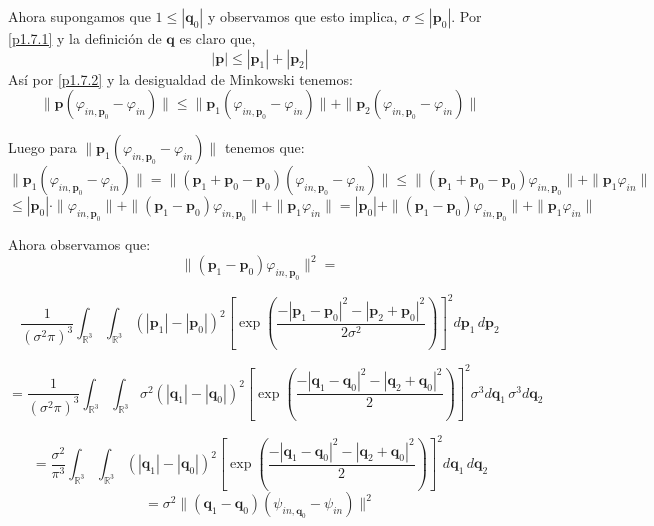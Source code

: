 \documentclass[12pt]{book}
\numberwithin{equation}{chapter}
\def\v{\mathbf}
\def\R{\mathbb{R}}
\def\vp{\varphi}
\def\P{\mathbf{p}}
\begin{document}
Ahora supongamos que $ 1 \leq |\v{q}_{0}|$ y observamos que esto implica, $\sigma \leq |\P_{0}| $. Por \eqref{p1.7.1} y la definici\'on de $\v{q}$ es claro que,
\begin{equation}\label{p1.7.2}
|\P|\leq |\P_{1}|+|\P_{2}|
\end{equation}
As\'i por \eqref{p1.7.2} y la desigualdad de Minkowski tenemos:
\begin{equation}\label{p1.7.3}
\| \P ( \vp_{in,\P_{0}} - \vp_{in} ) \| \leq \| \P_{1} ( \vp_{in,\P_{0}} - \vp_{in} ) \| + \| \P_{2} ( \vp_{in,\P_{0}} - \vp_{in} ) \|
\end{equation}

Luego para $\| \P_{1} ( \vp_{in,\P_{0}} - \vp_{in} ) \|$ tenemos que:
$$ \| \P_{1} ( \vp_{in,\P_{0}} - \vp_{in} ) \|= \| (\P_{1} + \P_{0}-\P_{0})  ( \vp_{in,\P_{0}} - \vp_{in} ) \| \leq \| (\P_{1} + \P_{0}-\P_{0}) \vp_{in,\P_{0}}  \|+ \| \P_{1} \vp_{in}  \| $$
\begin{equation}\label{p1.9}
\leq |\P_{0}| \cdot \| \vp_{in,\P_{0}} \| +\| (\P_{1}-\P_{0}) \vp_{in,\P_{0}}  \|+ \| \P_{1} \vp_{in}  \|= |\P_{0}|  +\| (\P_{1}-\P_{0}) \vp_{in,\P_{0}}  \|+ \| \P_{1} \vp_{in}  \|
\end{equation}

Ahora observamos que:
$$ \| (\P_{1}-\P_{0}) \vp_{in,\P_{0}}  \|^{2}= $$

$$\frac{1}{(\sigma^{2}\pi)^{3}} \int_{\R^{3}} \int_{\R^{3}} (|\P_{1}|-|\P_{0}|)^{2} \left[ \exp\left(\frac{-|\P_{1}-\P_{0}|^{2}-|\P_{2}+\P_{0}|^{2} }{2\sigma^{2}} \right) \right]^{2} d\P_{1}\,d\P_{2} $$

$$=\frac{1}{(\sigma^{2}\pi)^{3}} \int_{\R^{3}} \int_{\R^{3}} \sigma^{2} (|\v{q}_{1}|-|\v{q}_{0}|)^{2} \left[ \exp\left(\frac{-|\v{q}_{1}-\v{q}_{0}|^{2}-|\v{q}_{2}+\v{q}_{0}|^{2} }{2} \right) \right]^{2} \sigma^{3} d\v{q}_{1}\, \sigma^{3} d\v{q}_{2} $$

$$=  \frac{\sigma^{2}}{\pi^{3}} \int_{\R^{3}} \int_{\R^{3}} (|\v{q}_{1}|-|\v{q}_{0}|)^{2} \left[ \exp\left(\frac{-|\v{q}_{1}-\v{q}_{0}|^{2}-|\v{q}_{2}+\v{q}_{0}|^{2} }{2} \right) \right]^{2} d\v{q}_{1}\, d\v{q}_{2} $$
$$= \sigma^{2} \| (\v{q}_{1}-\v{q}_{0}) (\psi_{in,\v{q}_{0}}-\psi_{in}) \|^{2}$$
\end{document}
